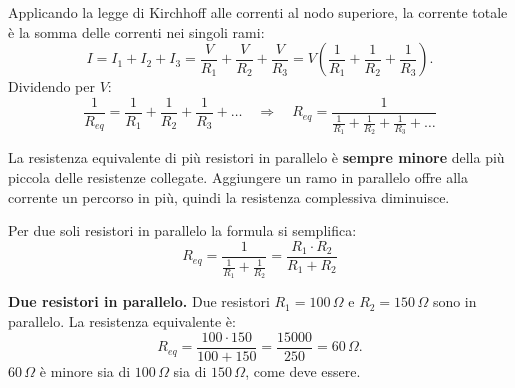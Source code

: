 \begin{center}
\end{center}

Applicando la legge di Kirchhoff alle correnti al nodo superiore, la corrente totale è la somma delle correnti nei singoli rami:
\[
I = I_1 + I_2 + I_3 = \frac{V}{R_1} + \frac{V}{R_2} + \frac{V}{R_3} = V \left( \frac{1}{R_1} + \frac{1}{R_2} + \frac{1}{R_3} \right).
\]
Dividendo per \(V\):
\[
\boxed{
\frac{1}{R_{eq}} = \frac{1}{R_1} + \frac{1}{R_2} + \frac{1}{R_3} + \dots \quad \Longrightarrow \quad R_{eq} = \frac{1}{\frac{1}{R_1} + \frac{1}{R_2} + \frac{1}{R_3} + \dots}
}
\]

\begin{concetto}
La resistenza equivalente di più resistori in parallelo è \textbf{sempre minore} della più piccola delle resistenze collegate. Aggiungere un ramo in parallelo offre alla corrente un percorso in più, quindi la resistenza complessiva diminuisce.
\end{concetto}


Per due soli resistori in parallelo la formula si semplifica:
\[
\boxed{
R_{eq} = \frac{1}{\frac{1}{R_1}+\frac{1}{R_2}} = \frac{R_1 \cdot R_2}{R_1 + R_2}
}
\]

\begin{esempio}
\textbf{Due resistori in parallelo.} Due resistori \(R_1 = 100\,\Omega\) e \(R_2 = 150\,\Omega\) sono in parallelo. La resistenza equivalente è:
\[
R_{eq} = \frac{100 \cdot 150}{100 + 150} = \frac{15000}{250} = 60\,\Omega.
\]
\(60\,\Omega\) è minore sia di \(100\,\Omega\) sia di \(150\,\Omega\), come deve essere.
\end{esempio}

